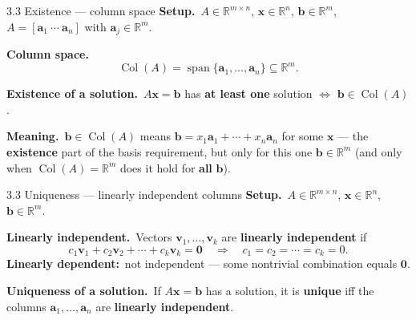 \documentclass[11pt,aspectratio=169]{beamer}
\begin{document}
\begin{frame}{3.3 Existence --- column space}
  \footnotesize
  \textbf{Setup.}\
  $A\in\mathbb{R}^{m\times n}$, $\mathbf{x}\in\mathbb{R}^n$, $\mathbf{b}\in\mathbb{R}^m$,
  $A=[\mathbf{a}_1\ \cdots\ \mathbf{a}_n]$ with $\mathbf{a}_j\in\mathbb{R}^m$.

  \medskip
  \textbf{Column space.}\
  \[
    \operatorname{Col}(A)=\operatorname{span}\{\mathbf{a}_1,\ldots,\mathbf{a}_n\}\subseteq\mathbb{R}^m.
  \]

  \medskip
  \textbf{Existence of a solution.}\
  $A\mathbf{x}=\mathbf{b}$ has \textbf{at least one} solution
  $\Longleftrightarrow$ $\mathbf{b}\in\operatorname{Col}(A)$.

  \medskip
  \textbf{Meaning.}\
  $\mathbf{b}\in\operatorname{Col}(A)$ means $\mathbf{b}=x_1\mathbf{a}_1+\cdots+x_n\mathbf{a}_n$ for
  some $\mathbf{x}$ --- the \textbf{existence} part of the basis requirement, but only for this one
  $\mathbf{b}\in\mathbb{R}^m$ (and only when $\operatorname{Col}(A)=\mathbb{R}^m$ does it hold for
  \textbf{all} $\mathbf{b}$).
\end{frame}

\begin{frame}{3.3 Uniqueness --- linearly independent columns}
  \footnotesize
  \textbf{Setup.}\
  $A\in\mathbb{R}^{m\times n}$, $\mathbf{x}\in\mathbb{R}^n$, $\mathbf{b}\in\mathbb{R}^m$.

  \medskip
  \textbf{Linearly independent.}\
  Vectors $\mathbf{v}_1,\ldots,\mathbf{v}_k$ are \textbf{linearly independent} if
  \[
    c_1\mathbf{v}_1+c_2\mathbf{v}_2+\cdots+c_k\mathbf{v}_k=\mathbf{0}
    \quad\Longrightarrow\quad
    c_1=c_2=\cdots=c_k=0.
  \]
  \textbf{Linearly dependent:}\ not independent --- some nontrivial combination equals $\mathbf{0}$.

  \medskip
  \textbf{Uniqueness of a solution.}\
  If $A\mathbf{x}=\mathbf{b}$ has a solution, it is \textbf{unique} iff the columns
  $\mathbf{a}_1,\ldots,\mathbf{a}_n$ are \textbf{linearly independent}.
\end{frame}
\end{document}
